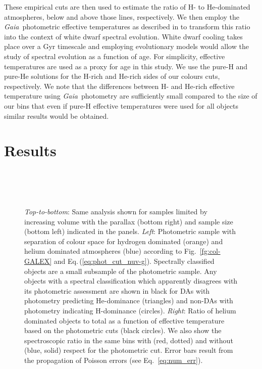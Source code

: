 \documentclass[a4paper,fleqn,usenatbib]{mnras}
\newcommand{\gaia}{{\it Gaia}}
\begin{document}
{\noindent}These empirical cuts are then used to estimate the ratio of H- to He-dominated atmospheres, below and above those lines, respectively. We then employ the \gaia\ photometric effective temperatures as described in \citet{ngf19} to transform this ratio into the context of white dwarf spectral evolution. White dwarf cooling takes place over a Gyr timescale \citep{dantona90} and employing evolutionary models would allow the study of spectral evolution as a function of age. For simplicity, effective temperatures are used as a proxy for age in this study. We use the pure-H and pure-He solutions for the H-rich and He-rich sides of our colours cuts, respectively. 
We note that the differences between H- and He-rich effective temperature using \gaia\ photometry are sufficiently small compared to the size of our bins that even if pure-H effective temperatures were used for all objects similar results would be obtained.



\section{Results}
\label{sec:results} 

\begin{figure*}
 \centering
 \\
 \\ 
 \\ 
 \caption{{\it Top-to-bottom}: Same analysis shown for samples limited by increasing volume with the parallax (bottom right) and sample size (bottom left) indicated in the panels. {\it Left}: Photometric sample with separation of colour space for hydrogen dominated (orange) and helium dominated atmospheres (blue) according to Fig.~\ref{fg:col-GALEX} and Eq.\,(\ref{eq:phot_cut_nuv-g}). Spectrally classified objects are a small subsample of the photometric sample. Any objects with a spectral classification which apparently disagrees with its photometric assessment are shown in black for DAs with photometry predicting He-dominance (triangles) and non-DAs with photometry indicating H-dominance (circles). {\it Right}: Ratio of helium dominated objects to total as a function of effective temperature based on the photometric cuts (black circles). We also show the spectroscopic ratio in the same bins with (red, dotted) and without (blue, solid) respect for the photometric cut. Error bars result from the propagation of Poisson errors (see Eq.~\eqref{eq:num_err}).} 
 \label{fg:phot-cut}
\end{figure*}
\end{document}
